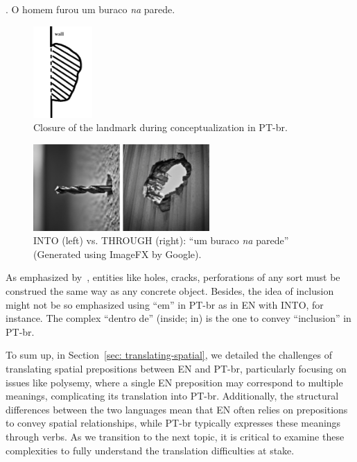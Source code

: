 {{\ex. O homem furou um buraco \emph{na} parede. \label{ex: em-into-through}  


\begin{figure}[ht]
\centering
\includegraphics[width=0.2\textwidth]{textual/Figuras/Screen Shot 2024-05-28 at 19.46.20.png}
\caption{Closure of the landmark during conceptualization in PT-br.}
\label{fig: hole-wall} 
\end{figure}

\begin{figure}[ht]
\centering
\includegraphics[width=0.6\textwidth]{textual/Figuras/Untitled design-4.png}
\caption{INTO (left) vs. THROUGH (right): ``um buraco  \emph{na} parede'' (Generated using ImageFX by Google).}
\label{fig:hole-wall2} 
\end{figure}

As emphasized by~\textcite{oliveira2012cognitive}, entities like holes, cracks, perforations of any sort must be construed the same way as any concrete object. Besides, the idea of inclusion might not be so emphasized using ``em'' in PT-br as in EN with INTO, for instance. The complex  ``dentro de'' (inside; in) is the one to convey ``inclusion'' in PT-br.

\vspace{0.5em} %

To sum up, in Section~\ref{sec: translating-spatial}, we detailed the challenges of translating spatial prepositions between EN and PT-br, particularly focusing on issues like polysemy, where a single EN preposition may correspond to multiple meanings, complicating its translation into PT-br. Additionally, the structural differences between the two languages mean that EN often relies on prepositions to convey spatial relationships, while PT-br typically expresses these meanings through verbs. As we transition to the next topic, it is critical to examine these complexities to fully understand the translation difficulties at stake.


}}
